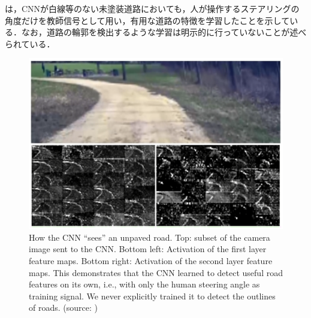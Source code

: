 \newpage

     は，CNNが白線等のない未塗装道路においても，人が操作するステアリングの角度だけを教師信号として用い，有用な道路の特徴を学習したことを示している．なお，道路の輪郭を検出するような学習は明示的に行っていないことが述べられている．

     \begin{figure}[h]
          \centering
          \includegraphics[keepaspectratio, scale=0.35] {images/bojarski_CNN.png}
          \captionsetup{justification=raggedright} %
          \caption[How the CNN ``sees'' an unpaved road. Top: subset of the camera image sent to the CNN. Bottom left: Activation of the first layer feature maps. Bottom right: Activation of the second layer feature maps. This demonstrates that the CNN learned to detect useful road features on its own, i.e., with only the human steering angle as training signal. We never explicitly trained it to detect the outlines of roads.]{How the CNN ``sees'' an unpaved road. Top: subset of the camera image sent to the CNN. Bottom left: Activation of the first layer feature maps. Bottom right: Activation of the second layer feature maps. This demonstrates that the CNN learned to detect useful road features on its own, i.e., with only the human steering angle as training signal. We never explicitly trained it to detect the outlines of roads. (source: \cite{bojarski})}
          \label{Fig:bojarski_CNN}
     \end{figure}

\newpage
